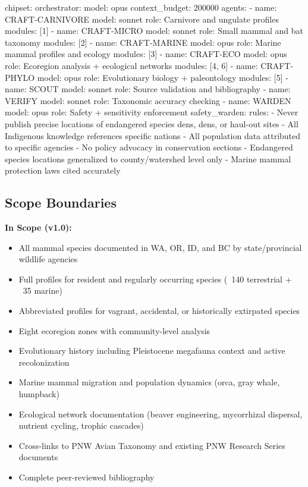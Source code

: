 \documentclass[11pt,letterpaper]{article}
\begin{document}
\begin{asciibox}
chipset:
  orchestrator:
    model: opus
    context_budget: 200000
  agents:
    - name: CRAFT-CARNIVORE
      model: sonnet
      role: Carnivore and ungulate profiles
      modules: [1]
    - name: CRAFT-MICRO
      model: sonnet
      role: Small mammal and bat taxonomy
      modules: [2]
    - name: CRAFT-MARINE
      model: opus
      role: Marine mammal profiles and ecology
      modules: [3]
    - name: CRAFT-ECO
      model: opus
      role: Ecoregion analysis + ecological networks
      modules: [4, 6]
    - name: CRAFT-PHYLO
      model: opus
      role: Evolutionary biology + paleontology
      modules: [5]
    - name: SCOUT
      model: sonnet
      role: Source validation and bibliography
    - name: VERIFY
      model: sonnet
      role: Taxonomic accuracy checking
    - name: WARDEN
      model: opus
      role: Safety + sensitivity enforcement
  safety_warden:
    rules:
      - Never publish precise locations of endangered
        species dens, dens, or haul-out sites
      - All Indigenous knowledge references specific nations
      - All population data attributed to specific agencies
      - No policy advocacy in conservation sections
      - Endangered species locations generalized to
        county/watershed level only
      - Marine mammal protection laws cited accurately
\end{asciibox}

\subsection{Scope Boundaries}

\textbf{In Scope (v1.0):}
\begin{itemize}[leftmargin=2em]
\item All mammal species documented in WA, OR, ID, and BC by state/provincial wildlife agencies
\item Full profiles for resident and regularly occurring species (~140 terrestrial + ~35 marine)
\item Abbreviated profiles for vagrant, accidental, or historically extirpated species
\item Eight ecoregion zones with community-level analysis
\item Evolutionary history including Pleistocene megafauna context and active recolonization
\item Marine mammal migration and population dynamics (orca, gray whale, humpback)
\item Ecological network documentation (beaver engineering, mycorrhizal dispersal, nutrient cycling, trophic cascades)
\item Cross-links to PNW Avian Taxonomy and existing PNW Research Series documents
\item Complete peer-reviewed bibliography
\end{itemize}
\end{document}
